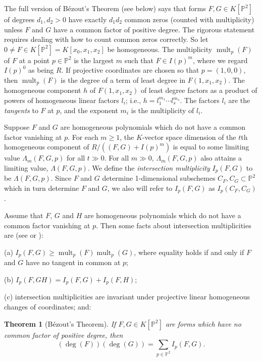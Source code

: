 \documentclass[11pt,twoside]{amsart}
\numberwithin{equation}{section}
\newtheorem{theorem}{Theorem}[section]
\theoremstyle{definition}
\begin{document}
The full version of B\'ezout's Theorem (see below) says that forms $F,G\in {K}[{\mathbb{P}^{2}}]$ of degrees
$d_1,d_2>0$ have exactly $d_1d_2$ common zeros (counted with multiplicity)
unless $F$ and $G$ have a common factor of positive degree.
The rigorous statement requires dealing with how to count common zeros correctly.
So let $0\neq F\in{K}[{\mathbb{P}^{2}}]={K}[x_0,x_1,x_2]$ be homogeneous.
The multiplicity ${\operatorname{mult}}_p(F)$ of $F$ at a point $p\in{\mathbb{P}^{2}}$ is the largest $m$ such that
$F\in I(p)^m$, where we regard $I(p)^0$ as being $R$.
If projective coordinates are chosen so that $p=(1,0,0)$, then
${\operatorname{mult}}_p(F)$ is the degree of a term of least degree in $F(1,x_1,x_2)$.
The homogeneous component $h$ of $F(1,x_1,x_2)$ of least degree
factors as a product of powers of homogeneous linear factors $l_i$;
i.e., $h=l_1^{m_1}\cdots l_s^{m_s}$.
The factors $l_i$ are the \emph{tangents} to $F$ at $p$,
and the exponent $m_i$ is the multiplicity of $l_i$.

Suppose $F$ and $G$ are homogeneous polynomials which do not have a common
factor vanishing at $p$. For each $m\geq1$, the ${K}$-vector space dimension
of the $t$th homogeneous component of $R/((F,G)+I(p)^m)$ is
equal to some limiting value $\Lambda_m(F,G,p)$ for all $t\gg0$.
For all $m\gg0$, $\Lambda_m(F,G,p)$ also attains a limiting value, $\Lambda(F,G,p)$.
We define the \emph{intersection multiplicity} $I_p(F,G)$ to be $\Lambda(F,G,p)$.
Since $F$ and $G$ determine 1-dimensional subschemes $C_F, C_G\subset{\mathbb{P}^{2}}$
which in turn determine $F$ and $G$,
we also will refer to $I_p(F,G)$ as $I_p(C_F,C_G)$.

Assume that $F$, $G$ and $H$ are homogeneous polynomials which do not have a common
factor vanishing at $p$. Then some facts about intersection multiplicities are (see \cite{refHr} or \cite{refF}):
\begin{description}
\item{(a)} $I_p(F,G)\geq {\operatorname{mult}}_p(F){\operatorname{mult}}_p(G)$, where equality holds if and only if
$F$ and $G$ have no tangent in common at $p$;
\item{(b)} $I_p(F,GH)=I_p(F,G)+I_p(F,H)$;
\item{(c)} intersection multiplicities are invariant under projective linear homogeneous changes of coordinates; and:
\end{description}

\begin{theorem}[B\'ezout's Theorem]\label{bigbezout}
If $F, G\in{K}[{\mathbb{P}^{2}}]$ are forms which have no common factor of positive degree, then 
$$(\deg(F))(\deg(G))=\sum_{p\in{\mathbb{P}^{2}}}I_p(F,G).$$
\end{theorem}
\end{document}
